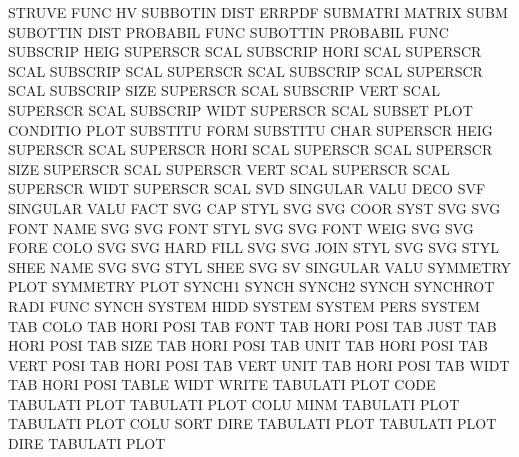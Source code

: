 STRUVE   FUNC                           HV
SUBBOTIN DIST                           ERRPDF
SUBMATRI                                MATRIX   SUBM
SUBOTTIN DIST                           PROBABIL FUNC
SUBOTTIN                                PROBABIL FUNC
SUBSCRIP HEIG                           SUPERSCR SCAL
SUBSCRIP HORI SCAL                      SUPERSCR SCAL
SUBSCRIP SCAL                           SUPERSCR SCAL
SUBSCRIP SCAL                           SUPERSCR SCAL
SUBSCRIP SIZE                           SUPERSCR SCAL
SUBSCRIP VERT SCAL                      SUPERSCR SCAL
SUBSCRIP WIDT                           SUPERSCR SCAL
SUBSET   PLOT                           CONDITIO PLOT
SUBSTITU FORM                           SUBSTITU CHAR
SUPERSCR HEIG                           SUPERSCR SCAL
SUPERSCR HORI SCAL                      SUPERSCR SCAL
SUPERSCR SIZE                           SUPERSCR SCAL
SUPERSCR VERT SCAL                      SUPERSCR SCAL
SUPERSCR WIDT                           SUPERSCR SCAL
SVD                                     SINGULAR VALU DECO
SVF                                     SINGULAR VALU FACT
SVG      CAP  STYL                      SVG
SVG      COOR SYST                      SVG
SVG      FONT NAME                      SVG
SVG      FONT STYL                      SVG
SVG      FONT WEIG                      SVG
SVG      FORE COLO                      SVG
SVG      HARD FILL                      SVG
SVG      JOIN STYL                      SVG
SVG      STYL SHEE NAME                 SVG
SVG      STYL SHEE                      SVG
SV                                      SINGULAR VALU
SYMMETRY PLOT                           SYMMETRY PLOT
SYNCH1                                  SYNCH
SYNCH2                                  SYNCH
SYNCHROT RADI FUNC                      SYNCH
SYSTEM   HIDD                           SYSTEM
SYSTEM   PERS                           SYSTEM
TAB      COLO                           TAB HORI POSI
TAB      FONT                           TAB HORI POSI
TAB      JUST                           TAB HORI POSI
TAB      SIZE                           TAB HORI POSI
TAB      UNIT                           TAB HORI POSI
TAB      VERT POSI                      TAB HORI POSI
TAB      VERT UNIT                      TAB HORI POSI
TAB      WIDT                           TAB HORI POSI
TABLE    WIDT                           WRITE
TABULATI PLOT CODE                      TABULATI PLOT
TABULATI PLOT COLU MINM                 TABULATI PLOT
TABULATI PLOT COLU SORT DIRE            TABULATI PLOT
TABULATI PLOT DIRE                      TABULATI PLOT
